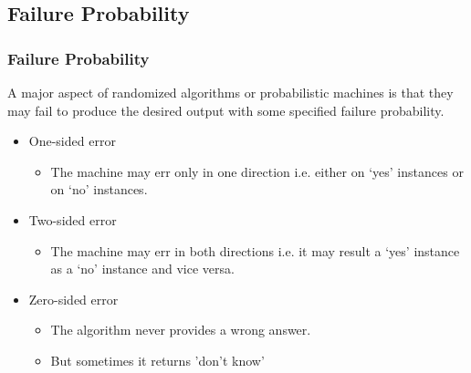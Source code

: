 \documentclass{beamer}
\begin{document}
\subsection{Failure Probability}
\begin{frame}
\frametitle{Failure Probability}
A major aspect of randomized algorithms or probabilistic machines is that they may fail to produce the desired output with some specified failure probability.

\begin{itemize}
	\item One-sided error
	\begin{itemize}
		\item The machine may err only in one direction  i.e. either on ‘yes’ instances or on ‘no’ instances.

	\end{itemize}
	\item Two-sided error
	\begin{itemize}
		\item The machine may err in both directions i.e. it may result a ‘yes’ instance as a ‘no’ instance and vice versa.

	\end{itemize}
	\item Zero-sided error
	\begin{itemize}
		\item The algorithm never provides a wrong answer.
		\item But sometimes it returns 'don't know'
	\end{itemize}
\end{itemize}
\end{frame}
\end{document}
